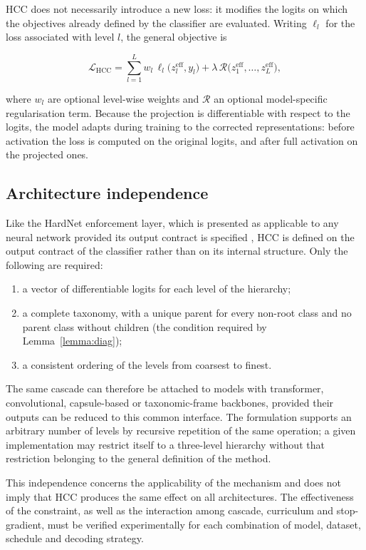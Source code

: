 HCC does not necessarily introduce a new loss: it modifies the logits on which the objectives already defined by the classifier are evaluated. Writing $\ell_l$ for the loss associated with level $l$, the general objective is

\[
\mathcal{L}_{\mathrm{HCC}}
=
\sum_{l=1}^{L}
w_l\,\ell_l\big(z_l^{\mathrm{eff}},y_l\big)
+
\lambda\,\mathcal{R}\big(z_1^{\mathrm{eff}},\dots,z_L^{\mathrm{eff}}\big),
\]

where $w_l$ are optional level-wise weights and $\mathcal{R}$ an optional model-specific regularisation term. Because the projection is differentiable with respect to the logits, the model adapts during training to the corrected representations: before activation the loss is computed on the original logits, and after full activation on the projected ones.

\subsection{Architecture independence}

Like the HardNet enforcement layer, which is presented as applicable to any neural network provided its output contract is specified \cite{min2024hardnet}, HCC is defined on the output contract of the classifier rather than on its internal structure. Only the following are required:

\begin{enumerate}
    \item a vector of differentiable logits for each level of the hierarchy;
    \item a complete taxonomy, with a unique parent for every non-root class and no parent class without children (the condition required by Lemma~\ref{lemma:diag});
    \item a consistent ordering of the levels from coarsest to finest.
\end{enumerate}

The same cascade can therefore be attached to models with transformer, convolutional, capsule-based or taxonomic-frame backbones, provided their outputs can be reduced to this common interface. The formulation supports an arbitrary number of levels by recursive repetition of the same operation; a given implementation may restrict itself to a three-level hierarchy without that restriction belonging to the general definition of the method.

This independence concerns the applicability of the mechanism and does not imply that HCC produces the same effect on all architectures. The effectiveness of the constraint, as well as the interaction among cascade, curriculum and stop-gradient, must be verified experimentally for each combination of model, dataset, schedule and decoding strategy.


